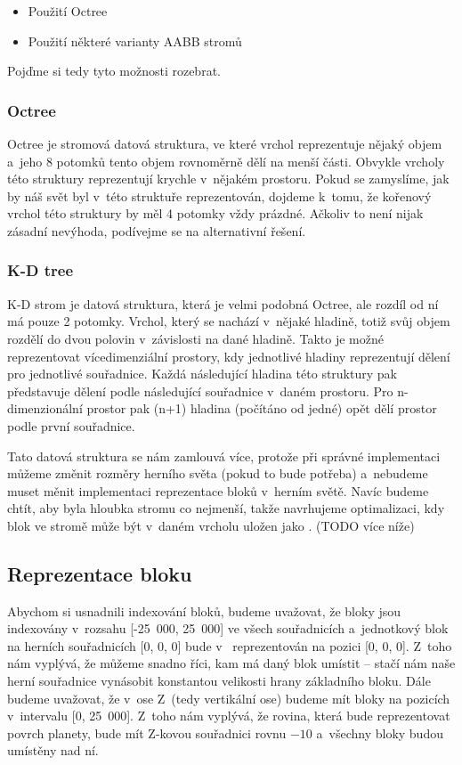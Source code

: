 \begin{itemize}
	\item Použití Octree
	\item Použití některé varianty AABB stromů
\end{itemize}

Pojďme si tedy tyto možnosti rozebrat.

\subsubsection{Octree}
Octree je stromová datová struktura, ve které vrchol reprezentuje nějaký objem a~jeho 8 potomků tento objem rovnoměrně dělí na menší části. Obvykle vrcholy této struktury reprezentují krychle v~nějakém prostoru. Pokud se zamyslíme, jak by náš svět byl v~této struktuře reprezentován, dojdeme k~tomu, že kořenový vrchol této struktury by měl 4 potomky vždy prázdné. Ačkoliv to není nijak zásadní nevýhoda, podívejme se na alternativní řešení.

\subsubsection{K-D tree}
K-D strom je datová struktura, která je velmi podobná Octree, ale rozdíl od ní má pouze 2 potomky. Vrchol, který se nachází v~nějaké hladině, totiž svůj objem rozdělí do dvou polovin v~závislosti na dané hladině. Takto je možné reprezentovat vícedimenziální prostory, kdy jednotlivé hladiny reprezentují dělení pro jednotlivé souřadnice. Každá následující hladina této struktury pak představuje dělení podle následující souřadnice v~daném prostoru. Pro n-dimenzionální prostor pak (n+1) hladina (počítáno od jedné) opět dělí prostor podle první souřadnice.

Tato datová struktura se nám zamlouvá více, protože při správné implementaci můžeme  změnit rozměry herního světa (pokud to bude potřeba) a~nebudeme muset měnit implementaci reprezentace bloků v~herním světě. Navíc budeme chtít, aby byla hloubka stromu co nejmenší, takže navrhujeme optimalizaci, kdy blok ve stromě může být v~daném vrcholu uložen jako . (TODO více níže)

\subsection{Reprezentace bloku}

Abychom si usnadnili indexování bloků, budeme uvažovat, že bloky jsou indexovány v~rozsahu [-25~000, 25~000] ve všech souřadnicích a~jednotkový blok na herních souřadnicích [0, 0, 0] bude v~\UEu{} reprezentován na pozici [0, 0, 0]. Z~toho nám vyplývá, že můžeme snadno \UEu{} říci, kam má daný blok umístit -- stačí nám naše herní souřadnice vynásobit konstantou velikosti hrany základního bloku. Dále budeme uvažovat, že v~ose Z~(tedy vertikální ose) budeme mít bloky na pozicích v~intervalu [0, 25~000]. Z~toho nám vyplývá, že rovina, která bude reprezentovat povrch planety, bude mít Z-kovou souřadnici rovnu $-10$ a~všechny bloky budou umístěny nad ní.

